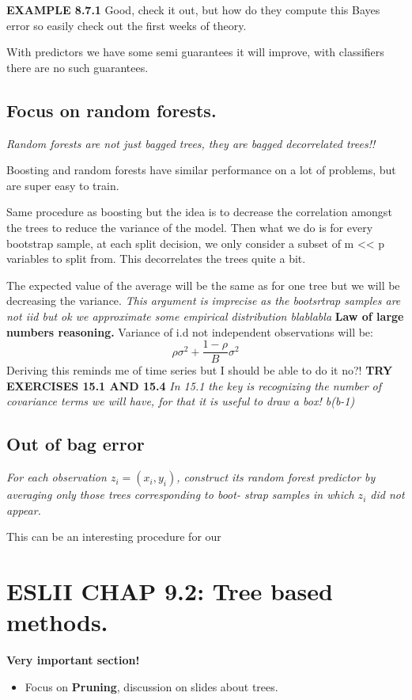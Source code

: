 \documentclass{article}
\begin{document}
\textbf{EXAMPLE 8.7.1} Good, check it out, but how do they compute this Bayes error so easily check out the first weeks of theory.

With predictors we have some semi guarantees it will improve, with classifiers there are no such guarantees.

\subsection*{Focus on random forests.}
\textit{Random forests are not just bagged trees, they are bagged decorrelated trees!!}

Boosting and random forests have similar performance on a lot of problems, but are super easy to train.

Same procedure as boosting but the idea is to decrease the correlation amongst the trees to reduce the variance of the model.
Then what we do is for every bootstrap sample, at each split decision, we only consider a subset of m << p variables to split from. This decorrelates the trees quite a bit.

The expected value of the average will be the same as for one tree but we will be decreasing the variance. \textit{This argument is imprecise as the bootsrtrap samples are not iid but ok we approximate some empirical distribution blablabla} \textbf{Law of large numbers reasoning.}
Variance of i.d not independent observations will be:
$$\rho \sigma^2 + \frac{1-\rho}{B}\sigma^2$$
Deriving this reminds me of time series but I should be able to do it no?!
\textbf{TRY EXERCISES 15.1 AND 15.4}
\textit{In 15.1 the key is recognizing the number of covariance terms we will have, for that it is useful to draw a box! b(b-1)}

\subsection*{Out of bag error}
\textit{For each observation $z_i = (x_i, y_i)$, construct its random forest
predictor by averaging only those trees corresponding to boot-
strap samples in which $z_i$ did not appear.}

This can be an interesting procedure for our 

\section*{ESLII CHAP 9.2: Tree based methods.}
\textbf{Very important section!}\\
\begin{itemize}
    \item Focus on \textbf{Pruning}, discussion on slides about trees.  
\end{itemize}
\end{document}

